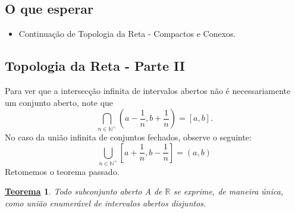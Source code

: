\documentclass{article}
\newtheorem*{theorem*}{\underline{Teorema}}
\begin{document}
\subsection{O que esperar}
\begin{itemize}
  \item Continua\c c\~ao de Topologia da Reta - Compactos e Conexos.
\end{itemize}
\subsection{Topologia da Reta - Parte II}
  Para ver que a intersec\c c\~ao infinita de intervalos abertos n\~ao \'e necessariamente um conjunto aberto, note que 
    $$
      \bigcap_{n\in \mathbb{N}^{\times}}^{}{(a-\frac{1}{n}, b+\frac{1}{n})} = [a, b].
    $$
  No caso da uni\~ao infinita de conjuntos fechados, observe o seguinte: 
    $$
     \bigcup_{n\in \mathbb{N}^{\times}}^{}{[a+\frac{1}{n}, b - \frac{1}{n}]}=(a, b)
    $$
  Retomemos o teorema passado.
  \begin{theorem*}
    Todo subconjunto aberto A de $\mathbb{R}$ se exprime, de maneira \'unica, como uni\~ao enumer\'avel de intervalos abertos disjuntos.
  \end{theorem*}
\end{document}
